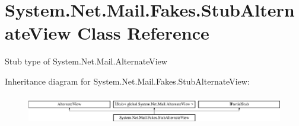 \hypertarget{class_system_1_1_net_1_1_mail_1_1_fakes_1_1_stub_alternate_view}{\section{System.\-Net.\-Mail.\-Fakes.\-Stub\-Alternate\-View Class Reference}
\label{class_system_1_1_net_1_1_mail_1_1_fakes_1_1_stub_alternate_view}
}


Stub type of System.\-Net.\-Mail.\-Alternate\-View 


Inheritance diagram for System.\-Net.\-Mail.\-Fakes.\-Stub\-Alternate\-View\-:\begin{figure}[H]
\begin{center}
\leavevmode
\includegraphics[height=1.314554cm]{class_system_1_1_net_1_1_mail_1_1_fakes_1_1_stub_alternate_view}
\end{center}
\end{figure}
